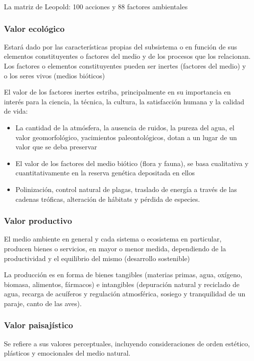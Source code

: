 La matriz de Leopold: 100 acciones y 88 factores ambientales
\subsubsection{Valor ecológico}
Estará dado por las características propias del subsistema o en función de sus elementos constituyentes o factores del medio y de los procesos que los relacionan. Los factores o elementos constituyentes pueden ser inertes (factores del medio) y o los seres vivos (medios bióticos)

El valor de los factores inertes estriba, principalmente en su importancia en interés para la ciencia, la técnica, la cultura, la satisfacción humana y la calidad de vida:
\begin{itemize}
    \item La cantidad de la atmósfera, la ausencia de ruidos, la pureza del agua, el valor geomorfológico, yacimientos paleontológicos, dotan a un lugar de un valor que se deba preservar
    \item El valor de los factores del medio biótico (flora y fauna), se basa cualitativa y cuantitativamente en la reserva genética depositada en ellos
    \item Polinización, control natural de plagas, traslado de energía a través de las cadenas tróficas, alteración de hábitats y pérdida de especies.
\end{itemize}
\subsubsection{Valor productivo}
El medio ambiente en general y cada sistema o ecosistema en particular, producen bienes o servicios, en mayor o menor medida, dependiendo de la productividad y el equilibrio del mismo (desarrollo sostenible)

La producción es en forma de bienes tangibles (materias primas, agua, oxígeno, biomasa, alimentos, fármacos) e intangibles (depuración natural y reciclado de agua, recarga de acuíferos y regulación atmosférica, sosiego y tranquilidad de un paraje, canto de las aves).

\subsubsection{Valor paisajístico}
Se refiere a sus valores perceptuales, incluyendo consideraciones de orden estético, plásticos y emocionales del medio natural.

